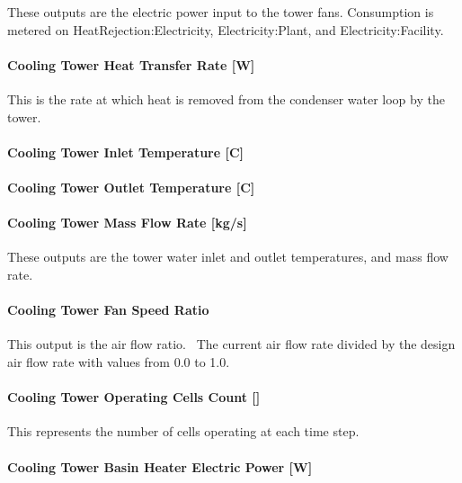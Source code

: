 These outputs are the electric power input to the tower fans. Consumption is metered on HeatRejection:Electricity, Electricity:Plant, and Electricity:Facility.

\paragraph{Cooling Tower Heat Transfer Rate {[}W{]}}\label{cooling-tower-heat-transfer-rate-w-2}

This is the rate at which heat is removed from the condenser water loop by the tower.

\paragraph{Cooling Tower Inlet Temperature {[}C{]}}\label{cooling-tower-inlet-temperature-c-2}

\paragraph{Cooling Tower Outlet Temperature {[}C{]}}\label{cooling-tower-outlet-temperature-c-2}

\paragraph{Cooling Tower Mass Flow Rate {[}kg/s{]}}\label{cooling-tower-mass-flow-rate-kgs-2}

These outputs are the tower water inlet and outlet temperatures, and mass flow rate.

\paragraph{Cooling Tower Fan Speed Ratio}\label{cooling-tower-fan-speed-ratio}

This output is the air flow ratio.~ The current air flow rate divided by the design air flow rate with values from 0.0 to 1.0.

\paragraph{Cooling Tower Operating Cells Count {[]}}\label{cooling-tower-operating-cells-count-2}

This represents the number of cells operating at each time step.

\paragraph{Cooling Tower Basin Heater Electric Power {[}W{]}}\label{cooling-tower-basin-heater-electric-power-w-2}

